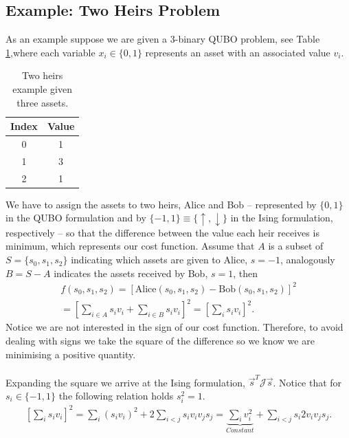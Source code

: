 \subsection{Example: Two Heirs Problem}
 As an example suppose we are given a 3-binary QUBO problem, see Table\,\ref{tab:Assets},where each variable $x_{i} \in \{0,1\}$ represents an asset with an associated value $v_{i}$.
\begin{table}[H]
\centering
\begin{tabular}{ |c | c| }
  \hline			
  \textbf{Index} & \textbf{Value}  \\
    \hline		
   0 & 1\\
       \hline		
   1 & 3\\
       \hline		
   2 & 1\\
        \hline	
\end{tabular}
\caption{Two heirs example given three assets.}
\label{tab:Assets}
\end{table}
We have to assign the assets to two heirs, Alice and Bob -- represented by $\{0,1\}$ in the QUBO formulation and by $\{-1,1\}\equiv \{\uparrow, \downarrow\}$ in the Ising formulation, respectively -- so that the difference between the value each heir receives is minimum, which represents our cost function. Assume that $A$ is a subset of $S = \{s_{0},s_{1},s_{2}\}$ indicating which assets are given to Alice, $s=-1$, analogously  $B = S - A$ indicates the assets received by Bob, $s=1$, then
\begin{align} 
    f(s_{0}, s_{1}, s_{2}) = \left[\text{Alice}(s_{0}, s_{1}, s_{2}) - \text{Bob}(s_{0}, s_{1}, s_{2})\right]^{2} \\
    = \left[\sum_{i\in A}s_{i}v_{i} + \sum_{i\in B}s_{i}v_{i}\right]^{2} = \left[\sum_{i}s_{i}v_{i}\right]^{2}.
\end{align}
Notice we are not interested in the sign of our cost function. Therefore, to avoid dealing with signs we take the square of the difference so we know we are minimising a positive quantity.\\\\
Expanding the square we arrive at the Ising formulation, $\vec{s}^{T}\mathcal{J}\vec{s}$. Notice that for $s_{i} \in \{-1,1\}$ the following relation holds $s_{i}^{2}=1$. 
\begin{align}
    \left[\sum_{i}s_{i}v_{i}\right]^{2} = \sum_{i}\left(s_{i}v_{i}\right)^{2} + 2\sum_{i<j}s_{i}v_{i}v_{j}s_{j} = \underbrace{\sum_{i}v_{i}^{2}}_{Constant} + \sum_{i<j}s_{i}2v_{i}v_{j}s_{j}.
\end{align}
